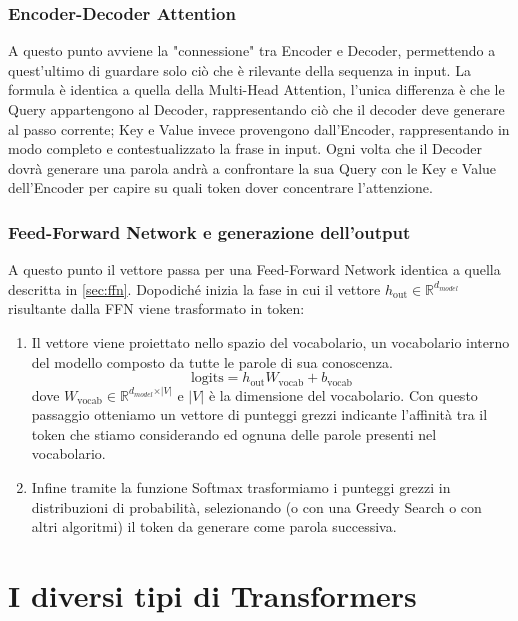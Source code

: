\documentclass{article}
\begin{document}
\subsubsection{Encoder-Decoder Attention}
A questo punto avviene la "connessione" tra Encoder e Decoder, permettendo a quest'ultimo di guardare solo ciò che è rilevante della sequenza in input.
La formula è identica a quella della Multi-Head Attention, l'unica differenza è che le Query appartengono al Decoder, rappresentando ciò che il decoder deve generare al passo corrente; 
Key e Value invece provengono dall'Encoder, rappresentando in modo completo e contestualizzato la frase in input.
Ogni volta che il Decoder dovrà generare una parola andrà a confrontare la sua Query con le Key e Value dell'Encoder per capire su quali token dover concentrare l'attenzione.
\subsubsection{Feed-Forward Network e generazione dell'output}
A questo punto il vettore passa per una Feed-Forward Network identica a quella descritta in \ref{sec:ffn}.
Dopodiché inizia la fase in cui il vettore $h_{\text{out}} \in \mathbb{R}^{d_{model}}$ risultante dalla FFN viene trasformato in token:
\begin{enumerate}
    \item Il vettore viene proiettato nello spazio del vocabolario, un vocabolario interno del modello composto da tutte le parole di sua conoscenza.
    $$\text{logits} = h_{\text{out}} W_{\text{vocab}} + b_{\text{vocab}}$$
    dove $W_{\text{vocab}} \in \mathbb{R}^{d_{model} \times \vert{}V\vert{}}$ e $\vert{}V\vert{}$ è la dimensione del vocabolario. Con questo passaggio otteniamo un vettore di punteggi grezzi indicante l'affinità tra il token che stiamo considerando ed ognuna delle parole presenti nel vocabolario.
    \item Infine tramite la funzione Softmax trasformiamo i punteggi grezzi in distribuzioni di probabilità, selezionando (o con una Greedy Search o con altri algoritmi) il token da generare come parola successiva.
\end{enumerate}



\section{I diversi tipi di Transformers}
\end{document}
